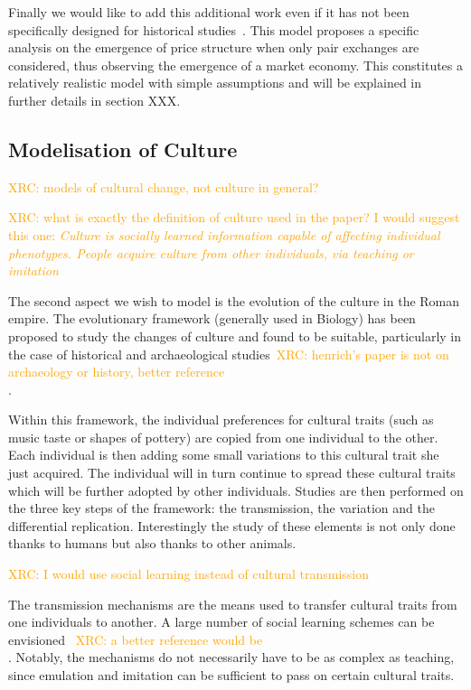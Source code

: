 \documentclass{wscpaperproc}
\newcommand{\memo}[2]{\textcolor{#1}{#2}}
\newcommand{\xrc}[1]{\memo{orange}{XRC: #1\\}}
\begin{document}

Finally we would like to add this additional work even if it has not been specifically designed for historical studies~\cite{gintis_emergence_2006}. This model proposes a specific analysis on the emergence of price structure when only pair exchanges are considered, thus observing the emergence of a market economy. This constitutes a relatively realistic model with simple assumptions and will be explained in further details in section XXX.


\subsection{Modelisation of Culture}

\xrc{models of cultural change, not culture in general?}

\xrc{what is exactly the definition of culture used in the paper? I would suggest this one: \emph{Culture is socially learned information capable of affecting  individual phenotypes. People acquire culture from other  individuals, via teaching or imitation} \cite{richerson1996}}

The second aspect we wish to model is the evolution of the culture in the Roman empire. The evolutionary framework (generally used in Biology) has been proposed to study the changes of culture and found to be suitable,  particularly in the case of historical and archaeological studies~\cite{lycett_cultural_2015,henrich_evolution_2003}\xrc{henrich's paper is not on archaeology or history, better reference \cite{shennan_2008}}.

Within this framework, the individual preferences for cultural traits (such as music taste or shapes of pottery) are copied from one individual to the other. Each individual is then adding some small variations to this cultural trait she just acquired. The individual will in turn continue to spread these cultural traits which will be further adopted by other individuals. Studies are then performed on the three key steps of the framework: the transmission, the variation and the differential replication. Interestingly the study of these elements is not only done thanks to humans but also thanks to other animals.

\xrc{I would use social learning instead of cultural transmission}

The transmission mechanisms are the means used to transfer cultural traits from one individuals to another. A large number of social learning schemes can be envisioned~\cite{heyes_social_1994} \xrc{a better reference would be \cite{henrich_evolution_2003}}. Notably, the mechanisms do not necessarily have to be as complex as teaching, since emulation and imitation can be sufficient to pass on certain cultural traits.
\end{document}

